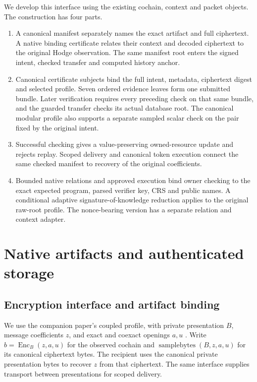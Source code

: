 We develop this interface using the existing cochain, context and packet
objects. The construction has four parts.
\begin{enumerate}
\item A canonical manifest separately names the exact artifact and full
ciphertext. A native binding certificate relates their context and decoded
ciphertext to the original Hodge observation. The same manifest root enters
the signed intent, checked transfer and computed history anchor.
\item Canonical certificate subjects bind the full intent, metadata,
ciphertext digest and selected profile. Seven ordered evidence leaves form
one submitted bundle. Later verification requires every preceding check on
that same bundle, and the guarded transfer checks its actual database root.
The canonical modular profile also supports a separate sampled scalar check
on the pair fixed by the original intent.
\item Successful checking gives a value-preserving owned-resource update
and rejects replay. Scoped delivery and canonical token execution connect
the same checked manifest to recovery of the original coefficients.
\item Bounded native relations and approved execution bind owner checking to
the exact expected program, parsed verifier key, CRS and public names. A
conditional adaptive signature-of-knowledge reduction applies to the
original raw-root profile. The nonce-bearing version has a separate relation
and context adapter.
\end{enumerate}

\section{Native artifacts and authenticated storage}

\subsection{Encryption interface and artifact binding}

We use the companion paper's coupled profile, with private presentation \(B\),
message coefficients \(z\), and exact and coexact openings \(a,u\)
\cite{vanderVlugt2026hcp}. Write \(b=\operatorname{Enc}_B(z,a,u)\) for the
observed cochain and \(\operatorname{samplebytes}(B,z,a,u)\) for its
canonical ciphertext bytes. The recipient uses the canonical private
presentation bytes to recover \(z\) from that ciphertext. The same
interface supplies transport between presentations for scoped delivery.

